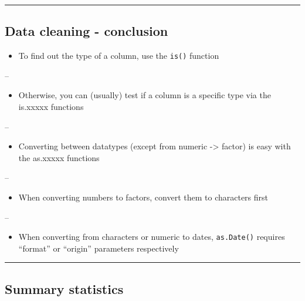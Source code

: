 \documentclass[]{article}
\providecommand{\tightlist}{%
  \setlength{\itemsep}{0pt}\setlength{\parskip}{0pt}}
\begin{document}
\begin{center}\rule{0.5\linewidth}{\linethickness}\end{center}

\hypertarget{data-cleaning---conclusion}{%
\subsection{Data cleaning -
conclusion}\label{data-cleaning---conclusion}}

\begin{itemize}
\tightlist
\item
  To find out the type of a column, use the \texttt{is()} function
\end{itemize}

--

\begin{itemize}
\tightlist
\item
  Otherwise, you can (usually) test if a column is a specific type via
  the is.xxxxx functions
\end{itemize}

--

\begin{itemize}
\tightlist
\item
  Converting between datatypes (except from numeric -\textgreater{}
  factor) is easy with the as.xxxxx functions
\end{itemize}

--

\begin{itemize}
\tightlist
\item
  When converting numbers to factors, convert them to characters first
\end{itemize}

--

\begin{itemize}
\tightlist
\item
  When converting from characters or numeric to dates,
  \texttt{as.Date()} requires ``format'' or ``origin'' parameters
  respectively
\end{itemize}

\begin{center}\rule{0.5\linewidth}{\linethickness}\end{center}

\hypertarget{summary-statistics}{%
\subsection{Summary statistics}\label{summary-statistics}}
\end{document}
